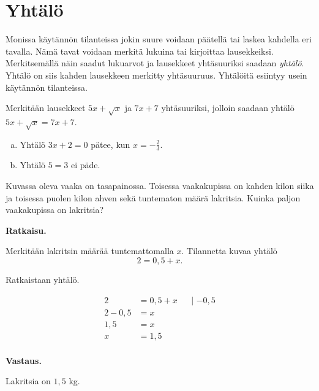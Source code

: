 \chapter{Yhtälö}

Monissa käytännön tilanteissa jokin suure voidaan päätellä tai laskea kahdella eri tavalla. Nämä tavat voidaan merkitä lukuina tai kirjoittaa lausekkeiksi. Merkitsemällä näin saadut lukuarvot ja lausekkeet yhtäsuuriksi saadaan \emph{yhtälö}. Yhtälö on siis kahden lausekkeen merkitty yhtäsuuruus. Yhtälöitä esiintyy usein käytännön tilanteissa.

\begin{esimerkki}
Merkitään lausekkeet $5x+\sqrt{x}$ ja $7x+7$ yhtäsuuriksi, jolloin saadaan
yhtälö $5x+\sqrt{x} = 7x+7$.
\end{esimerkki}


\begin{esimerkki}
\begin{enumerate}[a)]
\item Yhtälö $3x + 2 = 0$ pätee, kun $x = - \frac{2}{3}$.
\item Yhtälö $5 = 3$ ei päde.
\end{enumerate}
\end{esimerkki}


\begin{esimerkki}
Kuvassa oleva vaaka on tasapainossa. Toisessa vaakakupissa on kahden kilon siika ja toisessa puolen kilon ahven sekä tuntematon määrä lakritsia. Kuinka paljon vaakakupissa on lakritsia?

\textbf{Ratkaisu.}

Merkitään lakritsin määrää tuntemattomalla $x$. Tilannetta kuvaa yhtälö
\begin{equation}
2 = 0{,5} + x.
\end{equation}

Ratkaistaan yhtälö.

\begin{align*}
2 &= 0{,5} + x &&\text{| $-0{,5}$} \\
2 - 0{,5} &= x && \\
1{,5} &= x && \\
x &= 1{,5} && \\
\end{align*}


\textbf{Vastaus.}

Lakritsia on $1{,5}$ kg.
\end{esimerkki}

